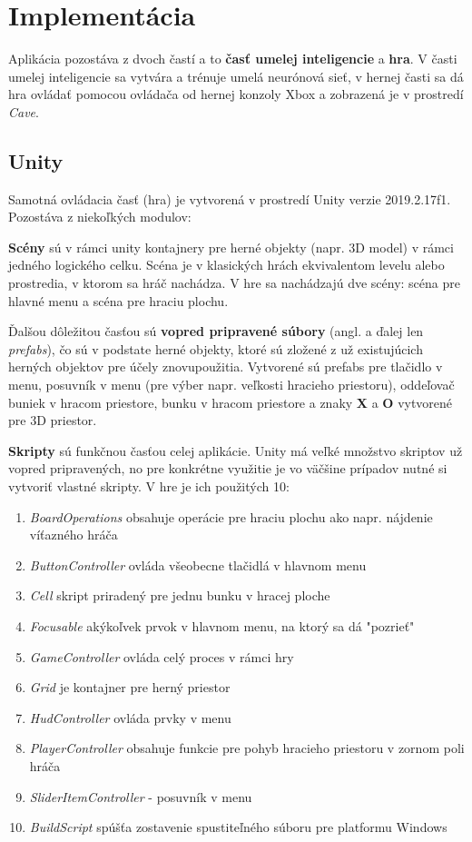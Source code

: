 \clearpage
\section{Implementácia}\label{sec:programming}

Aplikácia pozostáva z dvoch častí a to \textbf{časť umelej inteligencie} a \textbf{hra}.
V časti umelej inteligencie sa vytvára a trénuje umelá neurónová sieť, v hernej časti sa dá hra ovládať pomocou
ovládača od hernej konzoly Xbox a zobrazená je v prostredí \emph{Cave}.

\subsection{Unity}\label{subsec:unity}
Samotná ovládacia časť (hra) je vytvorená v prostredí Unity verzie 2019.2.17f1.
Pozostáva z niekoľkých modulov:

\textbf{Scény} sú v rámci unity kontajnery pre herné objekty (napr. 3D model) v rámci jedného logického celku.
Scéna je v klasických hrách ekvivalentom levelu alebo prostredia, v ktorom sa hráč nachádza.
V hre sa nachádzajú dve scény: scéna pre hlavné menu a scéna pre hraciu plochu.

Ďalšou dôležitou časťou sú \textbf{vopred pripravené súbory} (angl. a ďalej len \emph{prefabs}), čo sú v podstate herné
objekty, ktoré sú zložené z už existujúcich herných objektov pre účely znovupoužitia.
Vytvorené sú prefabs pre tlačidlo v menu, posuvník v menu (pre výber napr. veľkosti hracieho priestoru), oddeľovač
buniek v hracom priestore, bunku v hracom priestore a znaky \textbf{X} a \textbf{O} vytvorené pre 3D priestor.

\textbf{Skripty} sú funkčnou časťou celej aplikácie.
Unity má veľké množstvo skriptov už vopred pripravených, no pre konkrétne využitie je vo väčšine prípadov nutné si
vytvoriť vlastné skripty.
V hre je ich použitých 10:
\begin{enumerate}
    \item \emph{BoardOperations} obsahuje operácie pre hraciu plochu ako napr. nájdenie víťazného hráča
    \item \emph{ButtonController} ovláda všeobecne tlačidlá v hlavnom menu
    \item \emph{Cell} skript priradený pre jednu bunku v hracej ploche
    \item \emph{Focusable} akýkoľvek prvok v hlavnom menu, na ktorý sa dá "pozrieť"
    \item \emph{GameController} ovláda celý proces v rámci hry
    \item \emph{Grid} je kontajner pre herný priestor
    \item \emph{HudController} ovláda prvky v menu
    \item \emph{PlayerController} obsahuje funkcie pre pohyb hracieho priestoru v zornom poli hráča
    \item \emph{SliderItemController} - posuvník v menu
    \item \emph{BuildScript} spúšťa zostavenie spustiteľného súboru pre platformu Windows
\end{enumerate}

